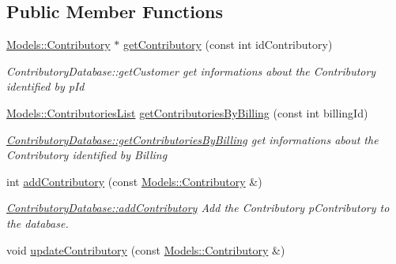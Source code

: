 \subsection*{Public Member Functions}
\begin{DoxyCompactItemize}
\item 
\hyperlink{classModels_1_1Contributory}{Models\+::\+Contributory} $\ast$ \hyperlink{classDatabases_1_1ContributoryDatabase_a76b6541c4b770a51b8d1a449631a5ffd}{get\+Contributory} (const int id\+Contributory)
\begin{DoxyCompactList}\small\item\em Contributory\+Database\+::get\+Customer get informations about the Contributory identified by {\itshape p\+Id} \end{DoxyCompactList}\item 
\hyperlink{classModels_1_1ContributoriesList}{Models\+::\+Contributories\+List} \hyperlink{classDatabases_1_1ContributoryDatabase_afa10024c8a5afe7fd6c09a254357e5c2}{get\+Contributories\+By\+Billing} (const int billing\+Id)
\begin{DoxyCompactList}\small\item\em \hyperlink{classDatabases_1_1ContributoryDatabase_afa10024c8a5afe7fd6c09a254357e5c2}{Contributory\+Database\+::get\+Contributories\+By\+Billing} get informations about the Contributory identified by {\itshape Billing} \end{DoxyCompactList}\item 
int \hyperlink{classDatabases_1_1ContributoryDatabase_abd7bf49a62d8e267d898936122b5c2a7}{add\+Contributory} (const \hyperlink{classModels_1_1Contributory}{Models\+::\+Contributory} \&)
\begin{DoxyCompactList}\small\item\em \hyperlink{classDatabases_1_1ContributoryDatabase_abd7bf49a62d8e267d898936122b5c2a7}{Contributory\+Database\+::add\+Contributory} Add the Contributory {\itshape p\+Contributory} to the database. \end{DoxyCompactList}\item 
\hypertarget{classDatabases_1_1ContributoryDatabase_a748062c6793dd80115ded9bffba75b6a}{}void \hyperlink{classDatabases_1_1ContributoryDatabase_a748062c6793dd80115ded9bffba75b6a}{update\+Contributory} (const \hyperlink{classModels_1_1Contributory}{Models\+::\+Contributory} \&)\label{classDatabases_1_1ContributoryDatabase_a748062c6793dd80115ded9bffba75b6a}


\end{DoxyCompactItemize}
